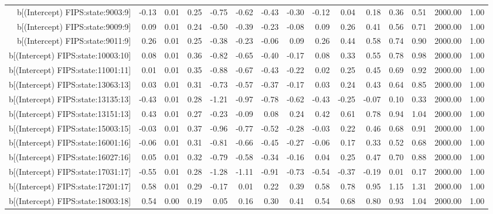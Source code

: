 \begin{table}[ht]
\begin{tabular}{rrrrrrrrrrrrrrr}
  b[(Intercept) FIPS:state:9003:9] & -0.13 & 0.01 & 0.25 & -0.75 & -0.62 & -0.43 & -0.30 & -0.12 & 0.04 & 0.18 & 0.36 & 0.51 & 2000.00 & 1.00 \\ 
  b[(Intercept) FIPS:state:9009:9] & 0.09 & 0.01 & 0.24 & -0.50 & -0.39 & -0.23 & -0.08 & 0.09 & 0.26 & 0.41 & 0.56 & 0.71 & 2000.00 & 1.00 \\ 
  b[(Intercept) FIPS:state:9011:9] & 0.26 & 0.01 & 0.25 & -0.38 & -0.23 & -0.06 & 0.09 & 0.26 & 0.44 & 0.58 & 0.74 & 0.90 & 2000.00 & 1.00 \\ 
  b[(Intercept) FIPS:state:10003:10] & 0.08 & 0.01 & 0.36 & -0.82 & -0.65 & -0.40 & -0.17 & 0.08 & 0.33 & 0.55 & 0.78 & 0.98 & 2000.00 & 1.00 \\ 
  b[(Intercept) FIPS:state:11001:11] & 0.01 & 0.01 & 0.35 & -0.88 & -0.67 & -0.43 & -0.22 & 0.02 & 0.25 & 0.45 & 0.69 & 0.92 & 2000.00 & 1.00 \\ 
  b[(Intercept) FIPS:state:13063:13] & 0.03 & 0.01 & 0.31 & -0.73 & -0.57 & -0.37 & -0.17 & 0.03 & 0.24 & 0.43 & 0.64 & 0.85 & 2000.00 & 1.00 \\ 
  b[(Intercept) FIPS:state:13135:13] & -0.43 & 0.01 & 0.28 & -1.21 & -0.97 & -0.78 & -0.62 & -0.43 & -0.25 & -0.07 & 0.10 & 0.33 & 2000.00 & 1.00 \\ 
  b[(Intercept) FIPS:state:13151:13] & 0.43 & 0.01 & 0.27 & -0.23 & -0.09 & 0.08 & 0.24 & 0.42 & 0.61 & 0.78 & 0.94 & 1.04 & 2000.00 & 1.00 \\ 
  b[(Intercept) FIPS:state:15003:15] & -0.03 & 0.01 & 0.37 & -0.96 & -0.77 & -0.52 & -0.28 & -0.03 & 0.22 & 0.46 & 0.68 & 0.91 & 2000.00 & 1.00 \\ 
  b[(Intercept) FIPS:state:16001:16] & -0.06 & 0.01 & 0.31 & -0.81 & -0.66 & -0.45 & -0.27 & -0.06 & 0.17 & 0.33 & 0.52 & 0.68 & 2000.00 & 1.00 \\ 
  b[(Intercept) FIPS:state:16027:16] & 0.05 & 0.01 & 0.32 & -0.79 & -0.58 & -0.34 & -0.16 & 0.04 & 0.25 & 0.47 & 0.70 & 0.88 & 2000.00 & 1.00 \\ 
  b[(Intercept) FIPS:state:17031:17] & -0.55 & 0.01 & 0.28 & -1.28 & -1.11 & -0.91 & -0.73 & -0.54 & -0.37 & -0.19 & 0.01 & 0.17 & 2000.00 & 1.00 \\ 
  b[(Intercept) FIPS:state:17201:17] & 0.58 & 0.01 & 0.29 & -0.17 & 0.01 & 0.22 & 0.39 & 0.58 & 0.78 & 0.95 & 1.15 & 1.31 & 2000.00 & 1.00 \\ 
  b[(Intercept) FIPS:state:18003:18] & 0.54 & 0.00 & 0.19 & 0.05 & 0.16 & 0.30 & 0.41 & 0.54 & 0.68 & 0.80 & 0.93 & 1.04 & 2000.00 & 1.00 \\ 

\end{tabular}
\end{table}
